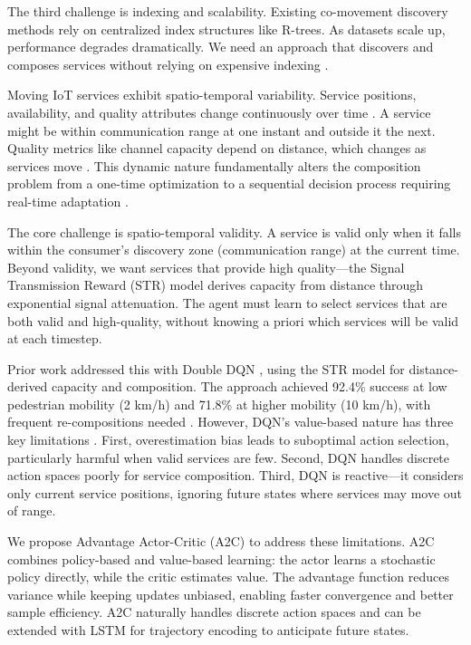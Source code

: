 \documentclass[10pt,twocolumn]{article}
\begin{document}
The third challenge is indexing and scalability. Existing co-movement
discovery methods rely on centralized index structures like R-trees. As
datasets scale up, performance degrades dramatically. We need an
approach that discovers and composes services without relying on
expensive indexing \cite{zhang2015}.

Moving IoT services exhibit spatio-temporal variability. Service
positions, availability, and quality attributes change continuously over
time \cite{deng2017}. A service might be within communication range at one instant and
outside it the next. Quality metrics like channel capacity depend on
distance, which changes as services move \cite{zhang2015}. This dynamic nature
fundamentally alters the composition problem from a one-time
optimization to a sequential decision process requiring real-time
adaptation \cite{gai2018}.

The core challenge is spatio-temporal validity. A service is valid only
when it falls within the consumer's discovery zone (communication range)
at the current time. Beyond validity, we want services that provide high
quality---the Signal Transmission Reward (STR) model derives capacity
from distance through exponential signal attenuation. The agent must
learn to select services that are both valid and high-quality, without
knowing a priori which services will be valid at each timestep.

Prior work addressed this with Double DQN \cite{neiat2021}, using the STR model
for distance-derived capacity and composition. The approach achieved
92.4\% success at low pedestrian mobility (2 km/h) and 71.8\% at higher
mobility (10 km/h), with frequent re-compositions needed \cite{neiat2021}. However,
DQN's value-based nature has three key limitations \cite{gai2018}. First,
overestimation bias leads to suboptimal action selection, particularly
harmful when valid services are few. Second, DQN handles discrete action
spaces poorly for service composition. Third, DQN is reactive---it
considers only current service positions, ignoring future states where
services may move out of range.

We propose Advantage Actor-Critic (A2C) to address these limitations.
A2C combines policy-based and value-based learning: the actor learns a
stochastic policy directly, while the critic estimates value. The
advantage function reduces variance while keeping updates unbiased,
enabling faster convergence and better sample efficiency. A2C naturally
handles discrete action spaces and can be extended with LSTM for
trajectory encoding to anticipate future states.
\end{document}
